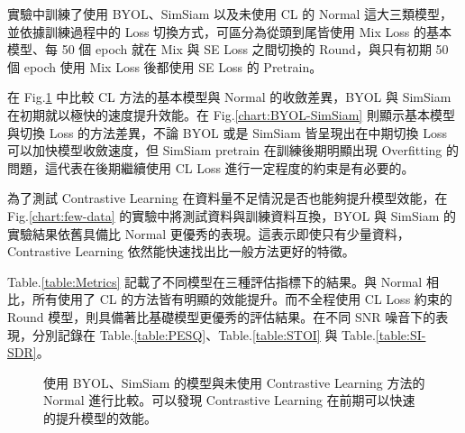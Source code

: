 \documentclass[10pt,twocolumn,letterpaper]{article}
\begin{document}
\begin{CJK}{UTF8}{bkai}
   實驗中訓練了使用 BYOL、SimSiam 以及未使用 CL 的 Normal 這大三類模型，並依據訓練過程中的 Loss
   切換方式，可區分為從頭到尾皆使用 Mix Loss 的基本模型、每 50 個 epoch 就在 Mix 與 SE Loss 之間切換的
   Round，與只有初期 50 個 epoch 使用 Mix Loss 後都使用 SE Loss 的 Pretrain。

   在 Fig.\ref{chart:CL-vs-Normal} 中比較 CL 方法的基本模型與 Normal 的收斂差異，BYOL 與 SimSiam
   在初期就以極快的速度提升效能。在 Fig.\ref{chart:BYOL-SimSiam} 則顯示基本模型與切換 Loss 的方法差異，不論
   BYOL 或是 SimSiam 皆呈現出在中期切換 Loss 可以加快模型收斂速度，但 SimSiam pretrain 在訓練後期明顯出現
   Overfitting 的問題，這代表在後期繼續使用 CL Loss 進行一定程度的約束是有必要的。

   為了測試 Contrastive Learning 在資料量不足情況是否也能夠提升模型效能，在 Fig.\ref{chart:few-data}
   的實驗中將測試資料與訓練資料互換，BYOL 與 SimSiam 的實驗結果依舊具備比 Normal 更優秀的表現。這表示即使只有少量資料，Contrastive
   Learning 依然能快速找出比一般方法更好的特徵。

   Table.\ref{table:Metrics} 記載了不同模型在三種評估指標下的結果。與 Normal 相比，所有使用了 CL
   的方法皆有明顯的效能提升。而不全程使用 CL Loss 約束的 Round 模型，則具備著比基礎模型更優秀的評估結果。在不同 SNR
   噪音下的表現，分別記錄在 Table.\ref{table:PESQ}、Table.\ref{table:STOI} 與 Table.\ref{table:SI-SDR}。

   \begin{figure}
      \begin{center}
      \end{center}
      \caption{使用 BYOL、SimSiam 的模型與未使用 Contrastive Learning 方法的 Normal
         進行比較。可以發現 Contrastive Learning 在前期可以快速的提升模型的效能。\label{chart:CL-vs-Normal}}
   \end{figure}


\end{CJK}
\end{document}
